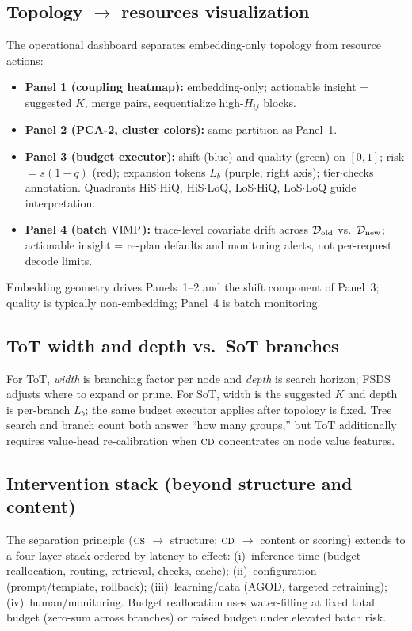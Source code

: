 \subsection{Topology $\to$ resources visualization}
\label{sec:viz-logic}

The operational dashboard separates embedding-only topology from resource actions:
\begin{itemize}[leftmargin=*]
  \item \textbf{Panel 1 (coupling heatmap):} embedding-only; actionable insight =
  suggested $K$, merge pairs, sequentialize high-$H_{ij}$ blocks.
  \item \textbf{Panel 2 (PCA-2, cluster colors):} same partition as Panel~1.
  \item \textbf{Panel 3 (budget executor):} shift (blue) and quality (green) on
  $[0,1]$; risk $= s(1-q)$ (red); expansion tokens $L_b$ (purple, right axis);
  tier$\cdot$checks annotation. Quadrants HiS$\cdot$HiQ, HiS$\cdot$LoQ,
  LoS$\cdot$HiQ, LoS$\cdot$LoQ guide interpretation.
  \item \textbf{Panel 4 (batch $\mathrm{VIMP}$):} trace-level covariate drift across
  $\mathcal{D}_{\mathrm{old}}$ vs.\ $\mathcal{D}_{\mathrm{new}}$; actionable insight = re-plan defaults and monitoring
  alerts, not per-request decode limits.
\end{itemize}
Embedding geometry drives Panels~1--2 and the shift component of Panel~3; quality
is typically non-embedding; Panel~4 is batch monitoring.

\subsection{ToT width and depth vs.\ SoT branches}
\label{sec:tot-vs-sot}

For ToT, \emph{width} is branching factor per node and \emph{depth} is search
horizon; FSDS adjusts where to expand or prune. For SoT, width is the suggested
$K$ and depth is per-branch $L_b$; the same budget executor applies after
topology is fixed. Tree search and branch count both answer ``how many groups,''
but ToT additionally requires value-head re-calibration when $\textsc{cd}$ concentrates
on node value features.

\subsection{Intervention stack (beyond structure and content)}
\label{sec:intervention-stack}

The separation principle ($\textsc{cs}$ $\to$ structure; $\textsc{cd}$ $\to$ content or scoring)
extends to a four-layer stack ordered by latency-to-effect: (i)~inference-time
(budget reallocation, routing, retrieval, checks, cache); (ii)~configuration
(prompt/template, rollback); (iii)~learning/data (AGOD, targeted retraining);
(iv)~human/monitoring. Budget reallocation uses water-filling at fixed total
budget (zero-sum across branches) or raised budget under elevated batch risk.

